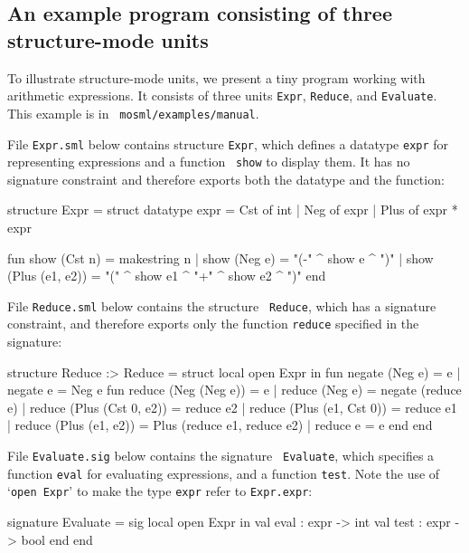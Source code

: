 \documentclass[fleqn]{article}
\begin{document}
\subsection{An example program consisting of three structure-mode units}
\label{sec-example-units}

To illustrate structure-mode units, we present a tiny program working
with arithmetic expressions.  It consists of three units {\tt Expr},
{\tt Reduce}, and {\tt Evaluate}.  This example is in {\tt
  mosml/examples/manual}.

File {\tt Expr.sml} below contains structure {\tt Expr}, which defines
a datatype {\tt expr} for representing expressions and a function {\tt
  show} to display them.  It has no signature constraint and therefore
exports both the datatype and the function:

\begin{program}
structure Expr = struct
    datatype expr = Cst of int | Neg of expr | Plus of expr * expr
        
    fun show (Cst n)         = makestring n
      | show (Neg e)         = "(-" ^ show e ^ ")"
      | show (Plus (e1, e2)) = "(" ^ show e1 ^ "+" ^ show e2 ^ ")"
end
\end{program}

\noindent File {\tt Reduce.sml} below contains the structure {\tt
  Reduce}, which has a signature constraint, and therefore exports
only the function {\tt reduce} specified in the signature:

\begin{program}
structure Reduce :> Reduce = struct
    local open Expr
    in
        fun negate (Neg e) = e
          | negate e       = Neg e
        fun reduce (Neg (Neg e))      = e
          | reduce (Neg e)            = negate (reduce e)
          | reduce (Plus (Cst 0, e2)) = reduce e2
          | reduce (Plus (e1, Cst 0)) = reduce e1
          | reduce (Plus (e1, e2))    = Plus (reduce e1, reduce e2)
          | reduce e                  = e
    end
end
\end{program}

\noindent File {\tt Evaluate.sig} below contains the signature {\tt
  Evaluate}, which specifies a function {\tt eval} for evaluating
expressions, and a function {\tt test}.  Note the use of `{\tt open
  Expr}' to make the type {\tt expr} refer to {\tt Expr.expr}:

\begin{program}
signature Evaluate = sig
    local open Expr 
    in 
        val eval : expr -> int
        val test : expr -> bool
    end
end
\end{program}
\end{document}
